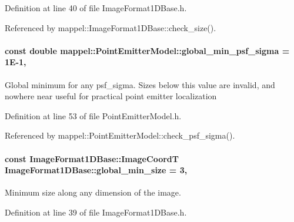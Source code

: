 Definition at line 40 of file Image\+Format1\+D\+Base.\+h.



Referenced by mappel\+::\+Image\+Format1\+D\+Base\+::check\+\_\+size().

\paragraph[{\texorpdfstring{global\+\_\+min\+\_\+psf\+\_\+sigma}{global_min_psf_sigma}}]{\setlength{\rightskip}{0pt plus 5cm}const double mappel\+::\+Point\+Emitter\+Model\+::global\+\_\+min\+\_\+psf\+\_\+sigma = 1\+E-\/1\hspace{0.3cm}{\ttfamily [static]}, {\ttfamily [inherited]}}\hypertarget{classmappel_1_1PointEmitterModel_a77d0ca98d77cb8b94117ece2a5b182a4}{}\label{classmappel_1_1PointEmitterModel_a77d0ca98d77cb8b94117ece2a5b182a4}
Global minimum for any psf\+\_\+sigma. Sizes below this value are invalid, and nowhere near useful for practical point emitter localization 

Definition at line 53 of file Point\+Emitter\+Model.\+h.



Referenced by mappel\+::\+Point\+Emitter\+Model\+::check\+\_\+psf\+\_\+sigma().

\paragraph[{\texorpdfstring{global\+\_\+min\+\_\+size}{global_min_size}}]{\setlength{\rightskip}{0pt plus 5cm}const {\bf Image\+Format1\+D\+Base\+::\+Image\+CoordT} Image\+Format1\+D\+Base\+::global\+\_\+min\+\_\+size = 3\hspace{0.3cm}{\ttfamily [static]}, {\ttfamily [inherited]}}\hypertarget{classmappel_1_1ImageFormat1DBase_a27c75df8b3d83856d7c2c42ee987af89}{}\label{classmappel_1_1ImageFormat1DBase_a27c75df8b3d83856d7c2c42ee987af89}
Minimum size along any dimension of the image. 

Definition at line 39 of file Image\+Format1\+D\+Base.\+h.



